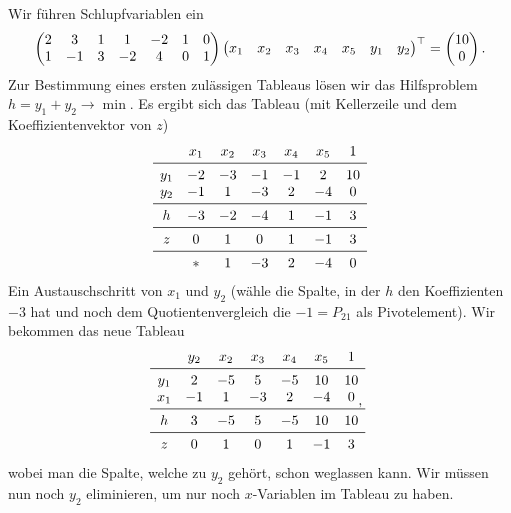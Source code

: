     \begin{solution}
        Wir führen Schlupfvariablen ein
        $$
        \begin{pmatrix}
            2 & 3 & 1 & 1 & -2 & 1 & 0\\
            1 & -1 & 3 & -2 & 4 & 0 & 1
        \end{pmatrix}
        \begin{pmatrix}
            x_1 & x_2 & x_3 & x_4 & x_5 & y_1 & y_2
        \end{pmatrix}^{\top}=
        \begin{pmatrix}
            10\\
            0
        \end{pmatrix}.
        $$
        Zur Bestimmung eines ersten zulässigen Tableaus lösen wir das Hilfsproblem $h=y_1+y_2\to\min$.
        Es ergibt sich das Tableau (mit Kellerzeile und dem Koeffizientenvektor von $z$)
        $$
        \begin{matrix}
            & x_1 & x_2 & x_3 & x_4 & x_5 & 1\\
            \midrule
            y_1 & -2 & -3 & -1 & -1 & 2 & 10\\
            y_2 & -1 & 1 & -3 & 2 & -4 & 0\\
            \midrule
            h & -3 & -2 & -4 & 1 & -1 & 3\\
            \midrule
            z & 0 & 1 & 0 & 1 & -1 & 3\\
            \midrule
            & * & 1 & -3 & 2 & -4 & 0
        \end{matrix}
        $$
        Ein Austauschschritt von $x_1$ und $y_2$ (wähle die Spalte, in der $h$ den Koeffizienten $-3$ hat und noch dem Quotientenvergleich die $-1=P_{21}$ als Pivotelement). Wir bekommen das neue Tableau
        $$
        \begin{matrix}
            & y_2 & x_2 & x_3 & x_4 & x_5 & 1\\
            \midrule
            y_1 & 2 & -5 & 5 & -5 & 10 & 10\\
            x_1 & -1 & 1 & -3 & 2 & -4 & 0\\
            \midrule
            h & 3 & -5 & 5 & -5 & 10 & 10\\
            \midrule
            z & 0 & 1 & 0 & 1 & -1 & 3
        \end{matrix},
        $$
        wobei man die Spalte, welche zu $y_2$ gehört, schon weglassen kann.
        Wir müssen nun noch $y_2$ eliminieren, um nur noch $x$-Variablen im Tableau zu haben.

\end{solution}
